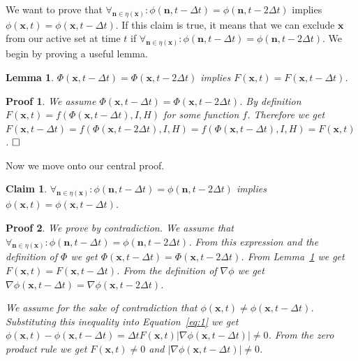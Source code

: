 \documentclass{egpubl}
\newcommand{\qed}{\hfill \ensuremath{\Box}}
\newtheorem{cla}{Claim}
\newtheorem{lem}{Lemma}
\newtheorem{pro}{Proof}
\begin{document}
{{We want to prove that ${\forall }_{{\mathbf n}\in \eta \left({\mathbf x}\right)}:\phi\left({\mathbf n},t-\Delta t\right)=\phi({\mathbf n},t-2\Delta t)$ implies $\phi\left({\mathbf x},t\right)=\phi\left({\mathbf x},t-\Delta t\right)$. If this claim is true, it means that we can exclude $\mathbf{x}$ from our active set at time $t$ if ${\forall }_{{\mathbf n}\in \eta \left({\mathbf x}\right)}:\phi\left({\mathbf n},t-\Delta t\right)=\phi({\mathbf n},t-2\Delta t)$. We begin by proving a useful lemma.

\begin{lem}
$\Phi \left({\mathbf x},t-\Delta t\right)=\Phi \left({\mathbf x},t-2\Delta t\right)$ implies $F\left({\mathbf x},t\right)=F\left({\mathbf x},t-\Delta t\right)$.
\label{lem:1}
\end{lem}

\begin{pro}
We assume $\Phi \left({\mathbf x},t-\Delta t\right)=\Phi \left({\mathbf x},t-2\Delta t\right)$. By definition $F\left({\mathbf x},t\right)=f(\Phi \left({\mathbf x},t-\Delta t\right),I,H)$ for some function $f$. Therefore we get $F\left({\mathbf x},t-\Delta t\right)=f\left(\Phi \left({\mathbf x},t-2\Delta t\right),I,H\right)=f\left(\Phi \left({\mathbf x},t-\Delta t\right),I,H\right)=F\left({\mathbf x},t\right)$. $\qed$
\end{pro}

Now we move onto our central proof.

\begin{cla}
${\forall }_{{\mathbf n}\in \eta \left({\mathbf x}\right)}:\phi\left({\mathbf n},t-\Delta t\right)=\phi({\mathbf n},t-2\Delta t)$ implies $\phi\left({\mathbf x},t\right)=\phi\left({\mathbf x},t-\Delta t\right)$.
\end{cla}

\begin{pro}
We prove by contradiction. We assume that ${\forall }_{{\mathbf n}\in \eta \left({\mathbf x}\right)}:\phi\left({\mathbf n},t-\Delta t\right)=\phi({\mathbf n},t-2\Delta t)$.
From this expression and the definition of $\Phi$ we get $\Phi \left({\mathbf x},t-\Delta t\right)=\Phi \left({\mathbf x},t-2\Delta t\right)$. From Lemma~\ref{lem:1} we get $F\left({\mathbf x},t\right)=F\left({\mathbf x},t-\Delta t\right)$. From the definition of $\nabla \phi$ we get $\nabla \phi\left({\mathbf x},t - \Delta t\right) = \nabla \phi\left({\mathbf x},t - 2 \Delta t\right)$.

\medskip

We assume for the sake of contradiction that $\phi\left({\mathbf x},t\right)\ne \phi\left({\mathbf x},t-\Delta t\right)$. Substituting this inequality into Equation~\ref{eq:1} we get $\phi\left({\mathbf x},t\right)-\phi\left({\mathbf x},t-\Delta t\right)=\Delta tF\left({\mathbf x},t\right)\left|\nabla \phi\left({\mathbf x},t-\Delta t\right)\right|\ne 0$. From the zero product rule we get $F\left({\mathbf x},t\right)\ne 0$ and $\left|\nabla \phi\left({\mathbf x},t-\Delta t\right)\right|\ne 0$.


\end{pro}}}
\end{document}
